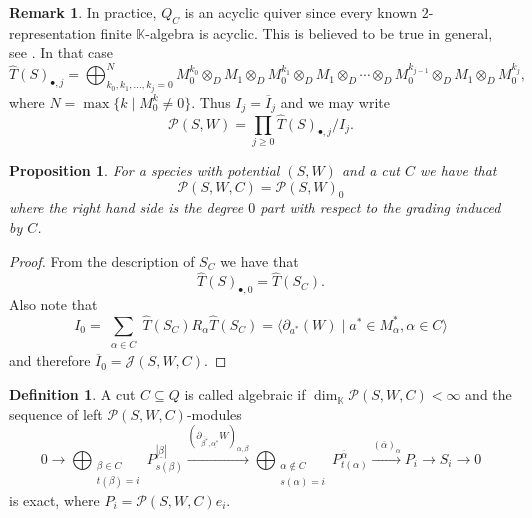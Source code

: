 \documentclass[a4paper, reqno]{amsart}
\newtheorem{myprop}[mythm]{Proposition}
\theoremstyle{definition}
\newtheorem{mydef}[mythm]{Definition}
\newtheorem{myrem}[mythm]{Remark}
\newcommand{\K}{\mathbb{K}}
\begin{document}
\begin{myrem}\label{remark - Qc acyclic}
	In practice, $Q_C$ is an acyclic quiver since every known $2$-representation finite $\K$-algebra is acyclic. This is believed to be true in general, see \cite[Question 5.9]{HI14nrepinfinitealg}. In that case
	\begin{equation*}
		\widehat{T}(S)_{\bullet, j} = \bigoplus_{k_0, k_1, \dots, k_j =0}^N M_0^{k_0} \otimes_D M_1 \otimes_D M_0^{k_1} \otimes_D M_1 \otimes_D \cdots \otimes_D M_0^{k_{j-1}} \otimes_D M_1 \otimes_D M_0^{k_j},
	\end{equation*}
	where $N = \max\{k \mid M_0^k \not=0\}$. Thus $I_j = \overline{I}_j$ and we may write
	\begin{equation*}
		\mathcal{P}(S, W) = \prod_{j\ge 0}\widehat{T}(S)_{\bullet, j} / I_j.
	\end{equation*}
\end{myrem}

\begin{myprop}\label{proposition - degree zero of jacobian}
	For a species with potential $(S, W)$ and a cut $C$ we have that
	\begin{equation*}
		\mathcal{P}(S, W, C) = \mathcal{P}(S, W)_0
	\end{equation*}
	where the right hand side is the degree $0$ part with respect to the grading induced by $C$.
\end{myprop}

\begin{proof}
	From the description of $S_C$ we have that
	\begin{equation*}
		\widehat{T}(S)_{\bullet, 0} = \widehat{T}(S_C).
	\end{equation*}
	Also note that
	\begin{equation*}
		I_0 = \sum_{\substack{\alpha\in C}}\widehat{T}(S_C) R_\alpha \widehat{T}(S_C) = \langle \partial_{a^*}(W) \mid a^*\in M_\alpha^*, \alpha\in C\rangle
	\end{equation*}
	and therefore $\overline{I}_0 = \mathcal{J}(S, W, C)$.
\end{proof}

\begin{mydef}
	A cut $C\subseteq Q$ is called algebraic if $\dim_\K \mathcal{P}(S, W, C)<\infty$ and the sequence of left $\mathcal{P}(S, W, C)$-modules
	\begin{equation}\label{eq - alg cut}
		0\to \bigoplus_{\substack{\beta\in C \\ t(\beta) = i}}P_{s(\beta)}^{|\underline{\beta}|} \xrightarrow{(\partial_{\overline{\beta^*}, \underline{\alpha^*}}W)_{\alpha, \beta}} \bigoplus_{\substack{\alpha\not\in C \\ s(\alpha) = i}}P_{t(\alpha)}^{\overline{\alpha}}\xrightarrow{(\overline{\alpha})_\alpha} P_i\to S_i\to 0
	\end{equation}
	is exact, where $P_i = \mathcal{P}(S, W, C)e_i$.
\end{mydef}
\end{document}
